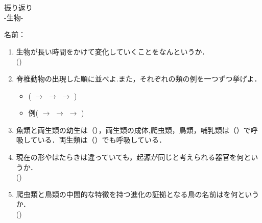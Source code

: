 \documentclass[fontsize=15pt]{jlreq}
\newcommand{\m}[1]{\raisebox{0.08em}{\textcircled{\scriptsize #1}}}
\begin{document}
\begin{center}
{\LARGE {振り返り}} \\
-生物\m{3}- %
\end{center}
\vspace{1em}
\begin{flushright}
名前：\underline{\hspace{5cm}}
\end{flushright}

\begin{enumerate}
    \item 生物が長い時間をかけて変化していくことをなんというか．\\
    (\hspace{2cm})
    \vspace{2em} 

    \item 脊椎動物の出現した順に並べよ.また，それぞれの類の例を一つずつ挙げよ．\\
    \begin{itemize}
    \item ( \hspace{2cm}$\rightarrow$ \hspace{2cm} $\rightarrow$\hspace{2cm} $\rightarrow$ \hspace{2cm}) 
    \vspace{2em}
    \item 例( \hspace{2cm}$\rightarrow$ \hspace{2cm} $\rightarrow$\hspace{2cm} $\rightarrow$ \hspace{2cm})
    \end{itemize}
    \vspace{2em} 

    \item 魚類と両生類の幼生は（\hspace{4cm}），両生類の成体,爬虫類，鳥類，哺乳類は（\hspace{4cm}）で呼吸している．両生類は（\hspace{4cm}）でも呼吸している．
    
    \vspace{2em} 

    \item 現在の形やはたらきは違っていても，起源が同じと考えられる器官を何というか．\\
    (\hspace{2cm})
    \vspace{2em} 

    \item 爬虫類と鳥類の中間的な特徴を持つ進化の証拠となる鳥の名前はを何というか．\\
    (\hspace{4cm})
    \vspace{2em} 

\end{enumerate}
\end{document}

